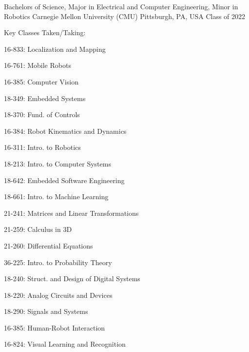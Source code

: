\begin{cventries}
\cventry
{Bachelors of Science, Major in Electrical and Computer Engineering, Minor in Robotics} %
{Carnegie Mellon University (CMU)} %
{Pittsburgh, PA, USA} %
{Class of 2022} %
{ %
	Key Classes Taken/Taking:\smallskip
	\begin{cvitems}
	\begin{multicols}{2}[]
        \item 16-833: Localization and Mapping 
        \item 16-761: Mobile Robots 
        \item 16-385: Computer Vision 
        \item 18-349: Embedded Systems 
        \item 18-370: Fund. of Controls 
        \item 16-384: Robot Kinematics and Dynamics 
        \item 16-311: Intro. to Robotics 
		\item 18-213: Intro. to Computer Systems 
        \item 18-642: Embedded Software Engineering
        \item 18-661: Intro. to Machine Learning
		\item 21-241: Matrices and Linear Transformations 
		\item 21-259: Calculus in 3D 
        \item 21-260: Differential Equations 
        \item 36-225: Intro. to Probability Theory 
        \item 18-240: Struct. and Design of Digital Systems 
        \item 18-220: Analog Circuits and Devices 
        \item 18-290: Signals and Systems 
        \item 16-385: Human-Robot Interaction 
        \item 16-824: Visual Learning and Recognition
	\end{multicols}
	\end{cvitems}
}


\end{cventries}